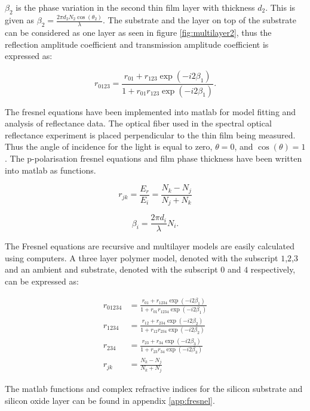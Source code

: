 \documentclass[MasterThesisMain.tex]{subfiles}
\begin{document}
$\beta_2$ is the phase variation in the second thin film layer with thickness $d_2$. This is given as $\beta_2=\frac{2\pi d_2N_2\cos(\theta_2)}{\lambda}$. The substrate and the layer on top of the substrate can be considered as one layer as seen in figure \ref{fig:multilayer2}, thus the reflection amplitude coefficient and transmission amplitude coefficient is expressed as:         

\begin{equation}\label{eq:multilayer}
r_{0123}= \frac{r_{01}+r_{123}\exp(-i2\beta_1)}{1+r_{01}r_{123}\exp(-i2\beta_1)}.
\end{equation}

The fresnel equations have been implemented into matlab for model fitting and analysis of reflectance data. The optical fiber used in  the spectral optical reflectance experiment is placed perpendicular to the thin film being measured. Thus the angle of incidence for the light is equal to zero, $\theta=0$, and $\cos(\theta)=1$. The p-polarisation fresnel equations and film phase thickness have been written into matlab as functions.

\begin{equation}
r_{jk} = \frac{E_{r}}{E_{i}} = \frac{N_k-N_j}{N_j+N_k}
\end{equation}

\begin{equation}
\beta_i=\frac{2\pi d_i}{\lambda} N_i.
\end{equation}

The Fresnel equations are recursive and multilayer models are easily calculated using computers. A three layer polymer model, denoted with the subscript $1$,$2$,$3$ and an ambient and substrate, denoted with the subscript $0$ and $4$ respectively, can be expressed as:

\begin{align}
r_{01234}&= \frac{r_{01}+r_{1234}\exp(-i2\beta_1)}{1+r_{01}r_{1234}\exp(-i2\beta_1)} \\
r_{1234} &= \frac{r_{12}+r_{234}\exp(-i2\beta_2)}{1+r_{12}r_{234}\exp(-i2\beta_2)} \\
r_{234}  &= \frac{r_{23}+r_{34}\exp(-i2\beta_3)}{1+r_{23}r_{34}\exp(-i2\beta_3)} \\
r_{jk}   &= \frac{N_k-N_j}{N_k + N_j}  
\end{align}
 
The matlab functions and complex refractive indices for the silicon substrate and silicon oxide layer can be found in appendix \ref{app:fresnel}. 


 

  
\end{document}
